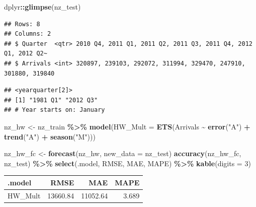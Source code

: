 \documentclass[
  11pt,
]{article}
\newenvironment{Shaded}{\begin{snugshade}}{\end{snugshade}}
\newcommand{\AttributeTok}[1]{\textcolor[rgb]{0.13,0.29,0.53}{#1}}
\newcommand{\DecValTok}[1]{\textcolor[rgb]{0.00,0.00,0.81}{#1}}
\newcommand{\FunctionTok}[1]{\textcolor[rgb]{0.13,0.29,0.53}{\textbf{#1}}}
\newcommand{\NormalTok}[1]{#1}
\newcommand{\OtherTok}[1]{\textcolor[rgb]{0.56,0.35,0.01}{#1}}
\newcommand{\SpecialCharTok}[1]{\textcolor[rgb]{0.81,0.36,0.00}{\textbf{#1}}}
\newcommand{\StringTok}[1]{\textcolor[rgb]{0.31,0.60,0.02}{#1}}
\newcounter{none} %
\begin{document}
\begin{Shaded}
\begin{Highlighting}[]
\NormalTok{dplyr}\SpecialCharTok{::}\FunctionTok{glimpse}\NormalTok{(nz\_test)}
\end{Highlighting}
\end{Shaded}

\begin{verbatim}
## Rows: 8
## Columns: 2
## $ Quarter  <qtr> 2010 Q4, 2011 Q1, 2011 Q2, 2011 Q3, 2011 Q4, 2012 Q1, 2012 Q2~
## $ Arrivals <int> 320897, 239103, 292072, 311994, 329470, 247910, 301880, 319840
\end{verbatim}

\begin{Shaded}
\end{Shaded}

\begin{verbatim}
## <yearquarter[2]>
## [1] "1981 Q1" "2012 Q3"
## # Year starts on: January
\end{verbatim}

\begin{Shaded}
\begin{Highlighting}[]
\NormalTok{nz\_hw }\OtherTok{\textless{}{-}}\NormalTok{ nz\_train }\SpecialCharTok{\%\textgreater{}\%}
  \FunctionTok{model}\NormalTok{(}\AttributeTok{HW\_Mult =} \FunctionTok{ETS}\NormalTok{(Arrivals }\SpecialCharTok{\textasciitilde{}} \FunctionTok{error}\NormalTok{(}\StringTok{"A"}\NormalTok{) }\SpecialCharTok{+} \FunctionTok{trend}\NormalTok{(}\StringTok{"A"}\NormalTok{) }\SpecialCharTok{+} \FunctionTok{season}\NormalTok{(}\StringTok{"M"}\NormalTok{)))}

\NormalTok{nz\_hw\_fc }\OtherTok{\textless{}{-}} \FunctionTok{forecast}\NormalTok{(nz\_hw, }\AttributeTok{new\_data =}\NormalTok{ nz\_test)}
\FunctionTok{accuracy}\NormalTok{(nz\_hw\_fc, nz\_test) }\SpecialCharTok{\%\textgreater{}\%} \FunctionTok{select}\NormalTok{(.model, RMSE, MAE, MAPE) }\SpecialCharTok{\%\textgreater{}\%} \FunctionTok{kable}\NormalTok{(}\AttributeTok{digits =} \DecValTok{3}\NormalTok{)}
\end{Highlighting}
\end{Shaded}

{\def\LTcaptype{none} %
\begin{longtable}[]{@{}lrrr@{}}
\toprule\noalign{}
.model & RMSE & MAE & MAPE \\
\midrule\noalign{}
\endhead
\bottomrule\noalign{}
\endlastfoot
HW\_Mult & 13660.84 & 11052.64 & 3.689 \\
\end{longtable}
}
\end{document}
